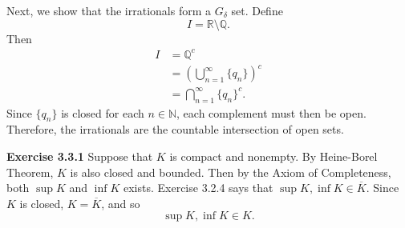 \documentclass[12pt]{article}
\begin{document}
\begin{enumerate}[label=(\alph*)]
          Next, we show that the irrationals form a \( G_{\delta } \) set.
          Define
          \[
              I = \mathbb{R} \setminus \mathbb{Q}.
          \]
          Then
          \[
              \begin{split}
                  I & = \mathbb{Q}^c                                   \\
                    & = \left(\bigcup_{n=1}^{\infty} \{q_n\} \right)^c \\
                    & = \bigcap_{n=1}^{\infty} \{q_n\}^c.
              \end{split}
          \]
          Since \( \{q_n\} \) is closed for each \( n \in \mathbb{N} \),
          each complement must then be open.
          Therefore, the irrationals are the countable intersection of open sets.
\end{enumerate}

\textbf{Exercise 3.3.1}
Suppose that \( K \) is compact and nonempty.
By Heine-Borel Theorem, \( K \) is also closed and bounded.
Then by the Axiom of Completeness, both \( \sup K \) and \( \inf K \) exists.
Exercise 3.2.4 says that
\( \sup K, \inf K \in \overline{K} \).
Since \( K \) is closed, \( K = \overline{K} \), and so
\[
    \sup K, \inf K \in K.
\]
\end{document}
